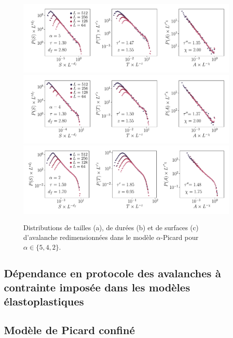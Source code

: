 \begin{figure}[H]
	\centering
	\includegraphics[width=\textwidth]{Chapitre4/Figures/Avalanches/Rescale_Av_alpha5.pdf}
	\includegraphics[width=\textwidth]{Chapitre4/Figures/Avalanches/Rescale_Av_alpha4.pdf}
	\includegraphics[width=\textwidth]{Chapitre4/Figures/Avalanches/Rescale_Av_alpha2.pdf}
	\caption{Distributions de tailles (a), de durées (b) et de surfaces (c) d'avalanche redimensionnées dans le modèle $\alpha$-Picard pour $\alpha \in \{5, 4, 2 \}$.}
	\label{fig:Av_rescale_alpha_annexe}
\end{figure}

\subsection{Dépendance en protocole des avalanches à contrainte imposée dans les modèles élastoplastiques}

\label{sec:article2}



\subsection{Modèle de Picard confiné}


